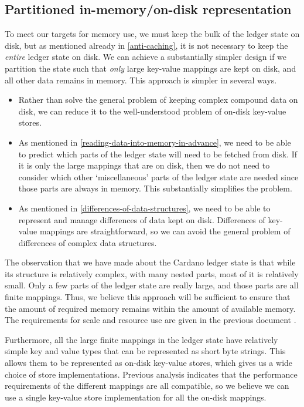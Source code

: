 \documentclass[11pt,a4paper]{article}
\begin{document}
\subsection{Partitioned in-memory/on-disk representation}
\label{partitioned-representation}

To meet our targets for memory use, we must keep the bulk of the ledger state on
disk, but as mentioned already in \cref{anti-caching}, it is not necessary to
keep the \emph{entire} ledger state on disk. We can achieve a substantially
simpler design if we partition the state such that \emph{only} large key-value
mappings are kept on disk, and all other data remains in memory. This approach
is simpler in several ways.
\begin{itemize}
\item Rather than solve the general problem of keeping complex compound data on
      disk, we can reduce it to the well-understood problem of on-disk
      key-value stores.
\item As mentioned in \cref{reading-data-into-memory-in-advance}, we need to be
      able to predict which parts of the ledger state will need to be fetched
      from disk. If it is only the large mappings that are on disk, then we do
      not need to consider which other `miscellaneous' parts of the ledger
      state are needed since those parts are always in memory. This
      substantially simplifies the problem.
\item As mentioned in \cref{differences-of-data-structures}, we need to be able
      to represent and manage differences of data kept on disk. Differences of
      key-value mappings are straightforward, so we can avoid the general
      problem of differences of complex data structures.
\end{itemize}

The observation that we have made about the Cardano ledger state is that while
its structure is relatively complex, with many nested parts, most of it is
relatively small. Only a few parts of the ledger state are really large, and
those parts are all finite mappings. Thus, we believe this approach will be
sufficient to ensure that the amount of required memory remains within the
amount of available memory. The requirements for scale and resource use are
given in the previous document \citep[Section 3]{utxo-db}.

Furthermore, all the large finite mappings in the ledger state have relatively
simple key and value types that can be represented as short byte strings. This
allows them to be represented as on-disk key-value stores, which gives us a
wide choice of store implementations. Previous analysis \citep[Section 5]{utxo-db}
indicates that the performance requirements of the different mappings are all
compatible, so we believe we can use a single key-value store implementation
for all the on-disk mappings.
\end{document}
